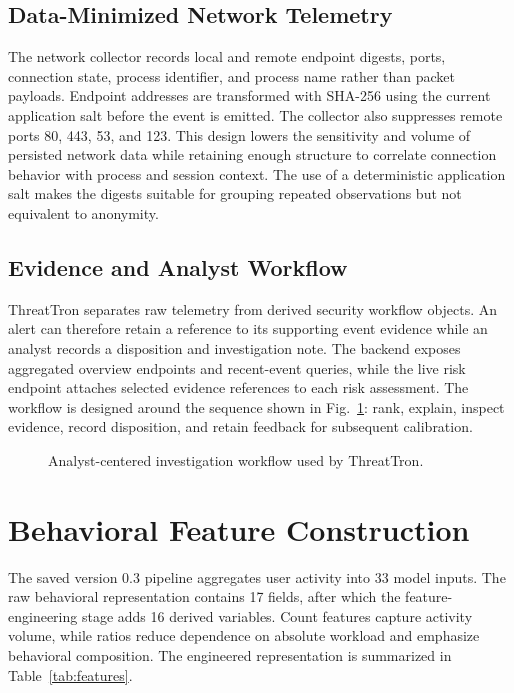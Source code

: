 \subsection{Data-Minimized Network Telemetry}
The network collector records local and remote endpoint digests, ports, connection state, process identifier, and process name rather than packet payloads. Endpoint addresses are transformed with SHA-256 using the current application salt before the event is emitted. The collector also suppresses remote ports 80, 443, 53, and 123. This design lowers the sensitivity and volume of persisted network data while retaining enough structure to correlate connection behavior with process and session context. The use of a deterministic application salt makes the digests suitable for grouping repeated observations but not equivalent to anonymity.

\subsection{Evidence and Analyst Workflow}
ThreatTron separates raw telemetry from derived security workflow objects. An alert can therefore retain a reference to its supporting event evidence while an analyst records a disposition and investigation note. The backend exposes aggregated overview endpoints and recent-event queries, while the live risk endpoint attaches selected evidence references to each risk assessment. The workflow is designed around the sequence shown in Fig.~\ref{fig:workflow}: rank, explain, inspect evidence, record disposition, and retain feedback for subsequent calibration.

\begin{figure}[t]
\centering
{}
\caption{Analyst-centered investigation workflow used by ThreatTron.}
\label{fig:workflow}
\end{figure}

\section{Behavioral Feature Construction}
The saved version 0.3 pipeline aggregates user activity into 33 model inputs. The raw behavioral representation contains 17 fields, after which the feature-engineering stage adds 16 derived variables. Count features capture activity volume, while ratios reduce dependence on absolute workload and emphasize behavioral composition. The engineered representation is summarized in Table~\ref{tab:features}.

